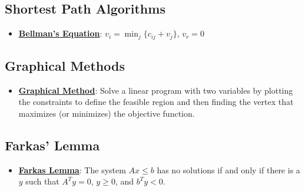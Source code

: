 \documentclass{article}%
\begin{document}
%
\subsection{Shortest Path Algorithms}%
\label{subsec:ShortestPathAlgorithms}%
\begin{itemize}[leftmargin=*]%
\item \href{https://www.math.purdue.edu/~yipn/421//2024-11-14-NetAppls.pdf#page=17}{\textbf{Bellman's Equation}}: $v_i = \min_{j} \{c_{ij} + v_j\}$, $v_r = 0$%
\end{itemize}

%
\subsection{Graphical Methods}%
\label{subsec:GraphicalMethods}%
\begin{itemize}[leftmargin=*]%
\item \href{https://www.math.purdue.edu/~yipn/421//2024-12-03-Duality.pdf#page=3}{\textbf{Graphical Method}}: Solve a linear program with two variables by plotting the constraints to define the feasible region and then finding the vertex that maximizes (or minimizes) the objective function.%
\end{itemize}

%
\subsection{Farkas' Lemma}%
\label{subsec:FarkasLemma}%
\begin{itemize}[leftmargin=*]%
\item \href{https://www.math.purdue.edu/~yipn/421//2024-10-28-Farkas.pdf#page=1}{\textbf{Farkas Lemma}}: The system $Ax \le b$ has no solutions if and only if there is a $y$ such that $A^T y = 0$, $y \ge 0$, and $b^T y < 0$.%
\end{itemize}

%
\end{document}
